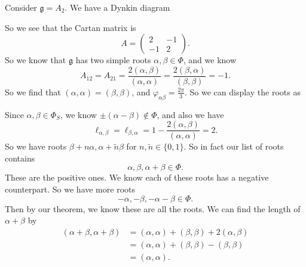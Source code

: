 \documentclass[a4paper]{article}
\begin{document}
\begin{eg}
  Consider $\mathfrak{g} = A_2$. We have a Dynkin diagram
  \begin{center}
  \end{center}
  So we see that the Cartan matrix is
  \[
    A =
    \begin{pmatrix}
      2 & -1\\
      -1 & 2
    \end{pmatrix}.
  \]
  So we know that $\mathfrak{g}$ has two simple roots $\alpha, \beta \in \Phi$, and we know
  \[
    A_{12} = A_{21} = \frac{2(\alpha, \beta)}{(\alpha, \alpha)} = \frac{2(\beta, \alpha)}{(\beta, \beta)} = -1.
  \]
  So we find that $(\alpha, \alpha) = (\beta, \beta)$, and $\varphi_{\alpha\beta} = \frac{2\pi}{3}$. So we can display the roots as
  \begin{center}
  \end{center}
  Since $\alpha, \beta \in \Phi_S$, we know $\pm(\alpha - \beta) \not\in \Phi$, and also we have
  \[
    \ell_{\alpha, \beta} = \ell_{\beta, \alpha} = 1 - \frac{2 (\alpha, \beta)}{(\alpha, \alpha)} = 2.
  \]
  So we have roots $\beta + n \alpha, \alpha + \tilde{n}\beta$ for $n, \tilde{n} \in \{0, 1\}$. So in fact our list of roots contains
  \[
    \alpha, \beta, \alpha + \beta \in \Phi.
  \]
  These are the positive ones. We know each of these roots has a negative counterpart. So we have more roots
  \[
    -\alpha, -\beta, -\alpha - \beta \in \Phi.
  \]
  Then by our theorem, we know these are all the roots. We can find the length of $\alpha + \beta$ by
  \begin{align*}
    (\alpha + \beta, \alpha + \beta) &= (\alpha, \alpha) + (\beta, \beta) + 2(\alpha, \beta)\\
    &= (\alpha, \alpha) + (\beta, \beta) - (\beta, \beta)\\
    &= (\alpha, \alpha).
  \end{align*}

\end{eg}
\end{document}
